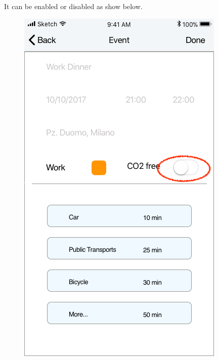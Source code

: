 It can be enabled or disabled as show below.
\begin{figure}[H]
	\centering
	\includegraphics[scale=0.23]{Images/Interface/CO2/1_C02_disabled}
	\hspace{0.5cm}

\end{figure}
